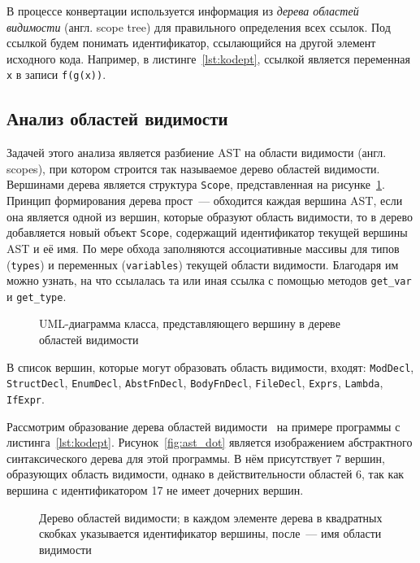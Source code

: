 В процессе конвертации используется информация из \textit{дерева областей видимости} (англ. scope tree) для правильного определения всех ссылок.
Под ссылкой будем понимать идентификатор, ссылающийся на другой элемент исходного кода.
Например, в листинге~\ref{lst:kodept}, ссылкой является переменная \lstinline{x} в записи \lstinline{f(g(x))}.

\subsection{Анализ областей видимости}
\label{subsec:scope_analysis}

Задачей этого анализа является разбиение AST на области видимости (англ. scopes), при котором строится так называемое дерево областей видимости.
Вершинами дерева является структура \lstinline{Scope}, представленная на рисунке~\ref{fig:scope_class}.
Принцип формирования дерева прост~--- обходится каждая вершина AST, если она является одной из вершин, которые образуют область видимости, то в дерево добавляется новый объект \lstinline{Scope}, содержащий идентификатор текущей вершины AST и её имя.
По мере обхода заполняются ассоциативные массивы для типов (\lstinline{types}) и переменных (\lstinline{variables}) текущей области видимости.
Благодаря им можно узнать, на что ссылалась та или иная ссылка с помощью методов \lstinline{get_var} и \lstinline{get_type}.

\begin{figure}
    \centering
    
    \caption{UML-диаграмма класса, представляющего вершину в дереве областей видимости}
    \label{fig:scope_class}
\end{figure}

В список вершин, которые могут образовать область видимости, входят: \lstinline{ModDecl}, \lstinline{StructDecl}, \lstinline{EnumDecl}, \lstinline{AbstFnDecl}, \lstinline{BodyFnDecl}, \lstinline{FileDecl}, \lstinline{Exprs}, \lstinline{Lambda}, \lstinline{IfExpr}.

Рассмотрим образование дерева областей видимости~ на примере программы с листинга~\ref{lst:kodept}.
Рисунок~\ref{fig:ast_dot} является изображением абстрактного синтаксического дерева для этой программы.
В нём присутствует 7 вершин, образующих область видимости, однако в действительности областей 6, так как вершина с идентификатором 17 не имеет дочерних вершин.

\begin{figure}[H]
    \centering
    
    \caption{Дерево областей видимости; в каждом элементе дерева в квадратных скобках указывается идентификатор вершины, после~--- имя области видимости}
    \label{fig:scopes}
\end{figure}

